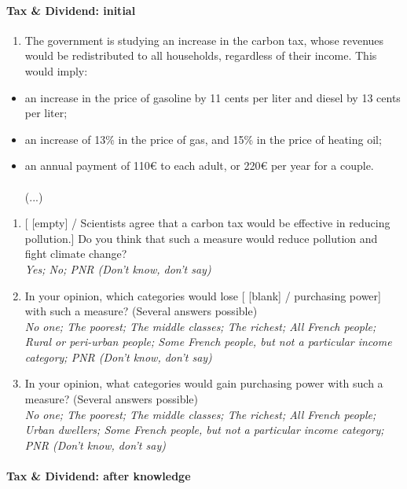 \documentclass[english,5p,authoryear]{elsarticle}
\begin{document}
\begin{appendices}
\paragraph{Tax \& Dividend: initial}
\begin{enumerate}[resume,leftmargin=*]
\item The government is studying an increase in the carbon tax, whose revenues
would be redistributed to all households, regardless of their income.
This would imply: 
\end{enumerate}
\begin{itemize}
\item an increase in the price of gasoline by 11 cents per liter and diesel
by 13 cents per liter; 
\item an increase of 13\% in the price of gas, and 15\% in the price of
heating oil;
\item an annual payment of 110\euro{} to each adult, or 220\euro{} per year for a couple.
\\
\\
(...)
\end{itemize}
\begin{enumerate}[resume,leftmargin=*]
\item {[} {[}empty{]} / Scientists agree that a carbon tax would be effective
in reducing pollution.{]} Do you think that such a measure would reduce
pollution and fight climate change? \textit{}\\
\textit{Yes; No; PNR (Don't know, don't say)}
\item In your opinion, which categories would lose {[} {[}blank{]} / purchasing
power{]} with such a measure? (Several answers possible) \textit{}\\
\textit{No one; The poorest; The middle classes; The richest; All French
people; Rural or peri-urban people; Some French people, but not a
particular income category; PNR (Don't know, don't say)} 
\item In your opinion, what categories would gain purchasing power with
such a measure? (Several answers possible) \textit{}\\
\textit{No one; The poorest; The middle classes; The richest; All French
people; Urban dwellers; Some French people, but not a particular income
category; PNR (Don't know, don't say)} 
\end{enumerate}

\paragraph{Tax \& Dividend: after knowledge}


\end{appendices}
\end{document}
